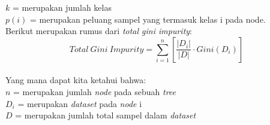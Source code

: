 $k$ = merupakan jumlah kelas\\
$p(i)$ = merupakan peluang sampel yang termasuk kelas i pada node.\\
Berikut merupakan rumus dari \textit{total gini impurity}:\\ 
\begin{equation}
Total \ Gini \ Impurity = \sum_{i=1}^n \left[\frac{|D_i|}{|D|} \cdot Gini(D_i)\right]
\end{equation}
\label{eq:2.totalgini}
\\
Yang mana dapat kita ketahui bahwa:\\
$n$ = merupakan jumlah \textit{node} pada sebuah \textit{tree}\\
$D_i$ = merupakan \textit{dataset} pada \textit{node} i\\
$D$ = merupakan  jumlah total sampel dalam \textit{dataset}\\

